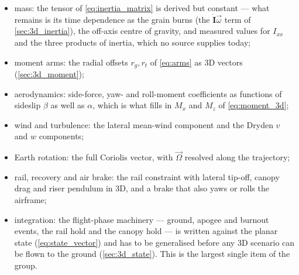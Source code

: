 \begin{itemize}
\begin{itemize}
        \item mass: the tensor of \autoref{eq:inertia_matrix} is derived but constant --- what
        remains is its time dependence as the grain burns (the $\dot{\mathbf{I}}\vec\omega$ term of
        \autoref{sec:3d_inertia}), the off-axis centre of gravity, and measured values for
        $I_{xx}$ and the three products of inertia, which no source supplies today;
        \item moment arms: the radial offsets $r_g,r_t$ of \autoref{eq:arms} as 3D vectors
        (\autoref{sec:3d_moment});
        \item aerodynamics: side-force, yaw- and roll-moment coefficients as functions of sideslip
        $\beta$ as well as $\alpha$, which is what fills in $M_x$ and $M_z$ of
        \autoref{eq:moment_3d};
        \item wind and turbulence: the lateral mean-wind component and the Dryden $v$ and $w$ components;
        \item Earth rotation: the full Coriolis vector, with $\vec{\Omega}$ resolved along the trajectory;
        \item rail, recovery and air brake: the rail constraint with lateral tip-off, canopy drag and
        riser pendulum in 3D, and a brake that also yaws or rolls the airframe;
        \item integration: the flight-phase machinery --- ground, apogee and burnout events, the
        rail hold and the canopy hold --- is written against the planar state
        (\autoref{eq:state_vector}) and has to be generalised before any 3D scenario can be flown
        to the ground (\autoref{sec:3d_state}). This is the largest single item of the group.
    \end{itemize}
\end{itemize}
